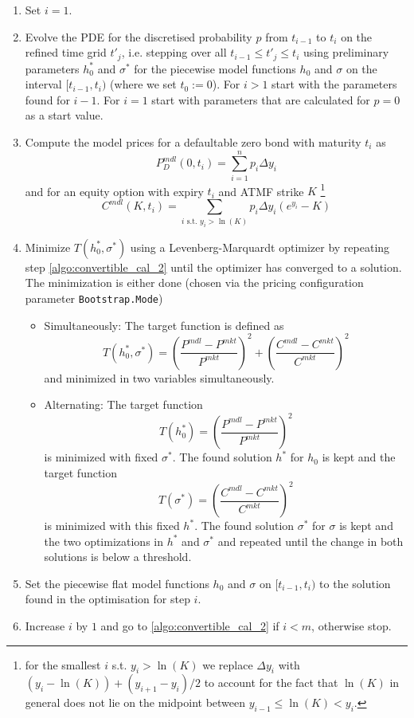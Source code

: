 {\begin{enumerate}
\item Set $i=1$.
\item \label{algo:convertible_cal_2} Evolve the PDE for the discretised probability $p$ from $t_{i-1}$ to $t_i$ on the
  refined time grid $t'_j$, i.e. stepping over all $t_{i-1} \leq t'_j \leq t_i$ using preliminary parameters $h_0^*$ and
  $\sigma^*$ for the piecewise model functions $h_0$ and $\sigma$ on the interval $[t_{i-1}, t_i)$ (where we set
  $t_0 :=0$). For $i>1$ start with the parameters found for $i-1$. For $i=1$ start with parameters that are calculated
  for $p=0$ as a start value.
\item Compute the model prices for a defaultable zero bond with maturity $t_i$ as
  $$P^{mdl}_D(0,t_i) = \sum_{i=1}^n p_i \Delta y_i$$
  and for an equity option with expiry $t_i$ and ATMF strike $K$ \footnote{for the smallest $i$ s.t. $y_i>\ln(K)$ we
    replace $\Delta y_i$ with $(y_i - \ln(K)) + (y_{i+1}-y_i) / 2$ to account for the fact that $\ln(K)$ in general does
    not lie on the midpoint between $y_{i-1} \leq \ln(K) < y_i$.}
  $$C^{mdl}(K,t_i) = \sum_{i \text{ s.t. } y_i > \ln(K)} p_i \Delta y_i ( e^{y_i} - K) $$
\item Minimize $T(h_0^*,\sigma^*)$ using a Levenberg-Marquardt optimizer by repeating step \ref{algo:convertible_cal_2}
  until the optimizer has converged to a solution. The minimization is either done (chosen via the pricing configuration
  parameter \verb+Bootstrap.Mode+)
  \begin{itemize}
  \item Simultaneously: The target function is defined as
    $$T(h_0^*,\sigma^*) = \left( \frac{P^{mdl} - P^{mkt}}{P^{mkt}} \right)^2  + \left( \frac{C^{mdl} - C^{mkt}}{C^{mkt}} \right)^2$$
    and minimized in two variables simultaneously.
  \item Alternating: The target function
    $$T(h_0^*) = \left( \frac{P^{mdl} - P^{mkt}}{P^{mkt}} \right)^2$$
  is minimized with fixed $\sigma^*$. The found solution $h^*$ for $h_0$ is kept and the target function
    $$T(\sigma^*) = \left( \frac{C^{mdl} - C^{mkt}}{C^{mkt}} \right)^2$$
    is minimized with this fixed $h^*$. The found solution $\sigma^*$ for $\sigma$ is kept and the two optimizations in
    $h^*$ and $\sigma^*$ and repeated until the change in both solutions is below a threshold.
  \end{itemize}
\item Set the piecewise flat model functions $h_0$ and $\sigma$ on $[t_{i-1},t_i)$ to the solution found in the
  optimisation for step $i$.
\item Increase $i$ by $1$ and go to \ref{algo:convertible_cal_2} if $i<m$, otherwise stop.
\end{enumerate}

}
